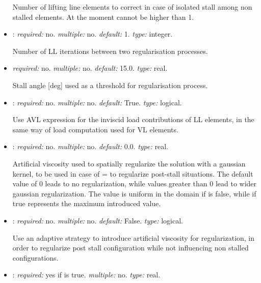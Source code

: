 \begin{itemize}
Number of lifting line elements to correct in case of isolated 
stall among non stalled elements. At the moment cannot be higher than 1.

\item {}: \textit{required:} no. 
\textit{multiple:} no. \textit{default:} 1. \textit{type:} integer.

Number of LL iterations between two regularisation processes.

\item {} \textit{required:} no. 
\textit{multiple:} no. \textit{default:} 15.0. \textit{type:} real.

Stall angle [deg] used as a threshold for regularisation process. 

\item {}: \textit{required:} no. \textit{multiple:} no. 
\textit{default:} True. \textit{type:} logical.

Use AVL expression for the inviscid load contributions of LL elements, 
in the same way of load computation used for VL elements.

\item {}: \textit{required:} no. 
\textit{multiple:} no. \textit{default:} 0.0. \textit{type:} real.

Artificial viscosity used to spatially regularize the solution with 
a gaussian kernel, to be used in case of  =  
to regularize post-stall situations. The default value of 0 leads to no 
regularization, while values greater than 0 lead to wider gaussian regularization. 
The value is uniform in the domain if  is 
false, while if true represents the maximum introduced value.

\item {}: \textit{required:} no. 
\textit{multiple:} no. \textit{default:} False. \textit{type:} logical.

Use an adaptive strategy to introduce artificial viscosity for regularization, 
in order to regularize post stall configuration while not influencing non 
stalled configurations. 

\item {}: \textit{required:} yes if 
 is true. \textit{multiple:} no. \textit{type:} real.


\end{itemize}

